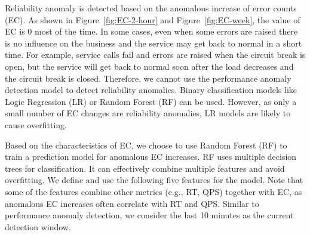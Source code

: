 Reliability anomaly is detected based on the anomalous increase of error counts (EC).
As shown in Figure~\ref{fig:EC-2-hour} and Figure~\ref{fig:EC-week}, the value of EC is 0 most of the time.
In some cases, even when some errors are raised there is no influence on the business and the service may get back to normal in a short time.
For example, service calls fail and errors are raised when the circuit break is open, but the service will get back to normal soon after the load decreases and the circuit break is closed.
Therefore, we cannot use the performance anomaly detection model to detect reliability anomalies.
Binary classification models like Logic Regression (LR) or Random Forest (RF) can be used.
However, as only a small number of EC changes are reliability anomalies, LR models are likely to cause overfitting.

Based on the characteristics of EC, we choose to use Random Forest (RF) to train a prediction model for anomalous EC increases.
RF uses multiple decision trees for classification.
It can effectively combine multiple features and avoid overfitting.
We define and use the following five features for the model.
Note that some of the features combine other metrics (e.g., RT, QPS) together with EC, as anomalous EC increases often correlate with RT and QPS.
Similar to performance anomaly detection, we consider the last 10 minutes as the current detection window.


